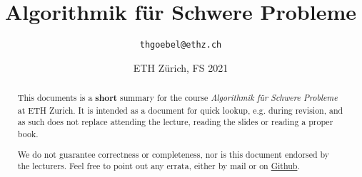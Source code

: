 \documentclass[paper=a4, parskip=half-]{scrartcl}
\title{Algorithmik für Schwere Probleme}
\author{\texttt{thgoebel@ethz.ch}}
\date{ETH Zürich, FS 2021}
\begin{document}
\begin{titlepage}
\maketitle
\vspace{5cm}
\thispagestyle{empty}


\begin{abstract}
This documents is a \textbf{short} summary for the course
\textit{Algorithmik für Schwere Probleme} at ETH Zurich.
It is intended as a document for quick lookup, e.g. during revision,
and as such does not replace attending the lecture, reading the slides or reading a proper book.

We do not guarantee correctness or completeness, nor is this document endorsed by the lecturers.
Feel free to point out any errata, either by mail or on
\href{https://github.com/eth-cs-student-summaries/Algorithmik-fuer-Schwere-Probleme/}{Github}.
\end{abstract}

\end{titlepage}

\tableofcontents
\newpage

\newpage


\newpage


\newpage


\newpage
\end{document}
